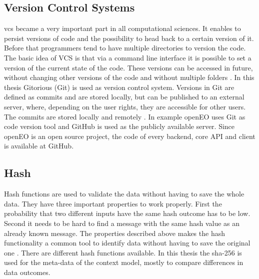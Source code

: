 \documentclass[draft,final]{vutinfth} %
\begin{document}
\subsection{Version Control Systems}\label{Version Control Systems}
\gls{vcs} became a very important part in all computational sciences. It enables to persist versions of code and the possibility to head back to a certain version of it. Before that programmers tend to have multiple directories to version the code. The basic idea of VCS is that via a command line interface it is possible to set a version of the current state of the code. These versions can be accessed in future, without changing other versions of the code and without multiple folders \cite{10.1109/MCSE.2009.194}. 
In this thesis Gitorious (Git) is used as version control system. Versions in Git are defined as commits and are stored locally, but can be published to an external server, where, depending on the user rights, they are accessible for other users. The commits are stored locally and remotely \cite{QuickGit}. In example openEO uses Git as code version tool and GitHub is used as the publicly available server. Since openEO is an open source project, the code of every backend, core API and client is available at GitHub.  

\subsection{Hash}\label{Hash}
Hash functions are used to validate the data without having to save the whole data. They have three important properties to work properly. First the probability that two different inputs have the same hash outcome has to be low. Second it needs to be hard to find a message with the same hash value as an already known message. The properties described above makes the hash functionality a common tool to identify data without having to save the original one \cite{3b412889270f46f59740fbf1ca8cd7e0}.  
There are different hash functions available. In this thesis the \gls{sha}-256 is used for the meta-data of the context model, mostly to compare differences in data outcomes.

\end{document}
